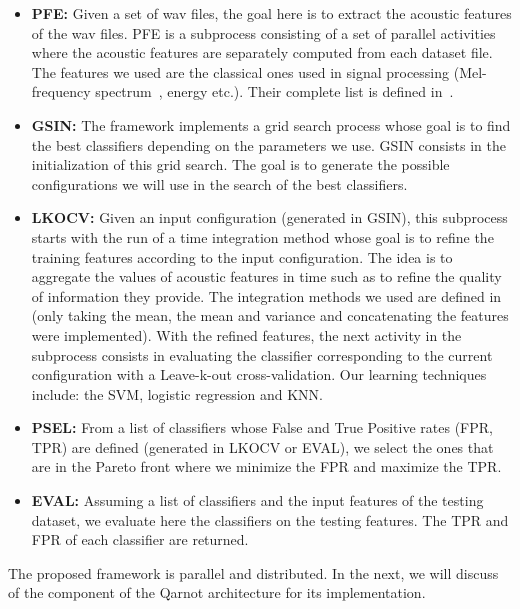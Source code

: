 \documentclass[10pt, conference, compsocconf]{IEEEtran}
\begin{document}
\begin{itemize}

\item {\bf PFE:} Given a set of wav files, the goal here is to extract the acoustic features of the wav files. PFE is a subprocess 
consisting of a set of parallel activities where the acoustic features are separately computed from each dataset file. 
The features we used are the classical ones used in signal processing (Mel-frequency spectrum~\cite{Davis:1990:CPR:108235.108239}, 
energy etc.). Their complete list is defined in~\cite{pyAudioAnalysis}. 

\item {\bf GSIN:} The framework implements a grid search process whose goal is to find the best classifiers depending on the 
parameters we use. GSIN consists in the initialization of this grid search. The goal is to generate the possible configurations 
we will use in the search of the best classifiers. 

\item {\bf LKOCV:} Given an input configuration (generated in GSIN), this subprocess starts with the run of a 
time integration method whose goal is to refine the training features according to the input configuration. The idea is 
to aggregate the values of acoustic features in time such as to refine the quality of information they provide. The integration 
methods we used are defined in~\cite{DBLP:journals/taslp/JoderER09} (only taking the mean, the mean and variance and concatenating the features were implemented). With the refined features, the next activity in the subprocess consists in evaluating the classifier corresponding to the current configuration with a Leave-k-out cross-validation. Our learning techniques include: the SVM, logistic regression and KNN. 

\item {\bf PSEL:} From a list of classifiers whose False and True Positive rates (FPR, TPR) are defined (generated in LKOCV or EVAL), we select the ones that are in the Pareto front where we minimize the FPR and maximize the TPR.

\item {\bf EVAL:}  Assuming a list of classifiers and the input features of the testing dataset, we evaluate here the classifiers on the testing features. The TPR and FPR of each classifier are returned.

\end{itemize}

The proposed framework is parallel and distributed. In the next, we will discuss of the component of the Qarnot architecture for 
its implementation.
\end{document}
